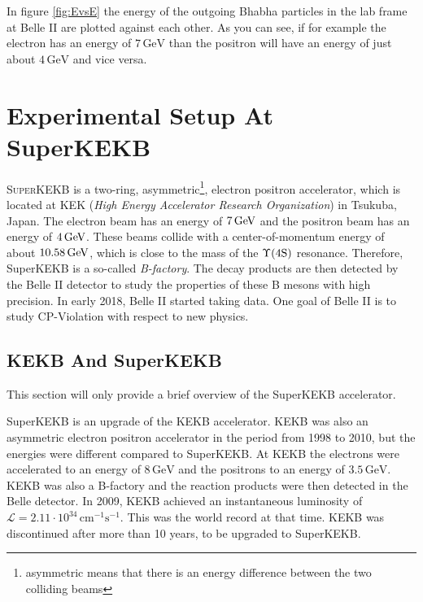 \documentclass[a4paper,11pt,twosided,final,german,openbib,pdftex,listof=totoc,bibliography=totoc]{scrbook}
\begin{document}
In figure \ref{fig:EvsE} the energy of the outgoing Bhabha particles in the lab frame at Belle II are plotted against each other. As you can see, if for example the electron has an energy of $7\,\textrm{GeV}$ than the positron will have an energy of just about $4\,\textrm{GeV}$ and vice versa.



\chapter{Experimental Setup At SuperKEKB}
\label{sec:SetupKEK}

\lettrine{S}{uperKEKB} is a two-ring, asymmetric\footnote{asymmetric means that there is an energy difference between the two colliding beams}, electron positron accelerator, which is located at KEK (\textit{High Energy Accelerator Research Organization}) in Tsukuba, Japan. 
The electron beam has an energy of $7\,\textnormal{GeV}$ and the positron beam has an energy of $4\,\textnormal{GeV}$. These beams collide with a center-of-momentum energy of about $10.58\,\textnormal{GeV}$, which is close to the mass of the $\Upsilon(4\textnormal{S})$ resonance. Therefore, SuperKEKB is a so-called \textit{B-factory}. The decay products are then detected by the Belle II detector to study the properties of these B mesons with high precision. In early 2018, Belle II started taking data. One goal of Belle II is to study CP-Violation with respect to new physics.\cite{B2B}

\section{KEKB And SuperKEKB}
\label{sec:KEK}
This section will only provide a brief overview of the SuperKEKB accelerator.

SuperKEKB is an upgrade of the KEKB accelerator. KEKB was also an asymmetric electron positron accelerator in the period from 1998 to 2010, but the energies were different compared to SuperKEKB. At KEKB the electrons were accelerated to an energy of $8\,\textrm{GeV}$ and the positrons to an energy of $3.5\,\textrm{GeV}$. KEKB was also a B-factory and the reaction products were then detected in the Belle detector. In 2009, KEKB achieved an instantaneous luminosity of $\mathcal{L} = 2.11 \cdot 10^{34}\,\textrm{cm}^{-1}\textrm{s}^{-1}$. This was the world record at that time. KEKB was discontinued after more than 10 years, to be upgraded to SuperKEKB.\cite{PTEP}
\end{document}
